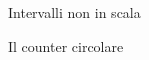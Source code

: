 \begin{figure} %
  \centering
  \def\stackalignment{r} %
  {\scriptsize \parbox[t]{\linewidth}{Intervalli non in scala}}
  \caption{Il counter circolare}
\end{figure}

